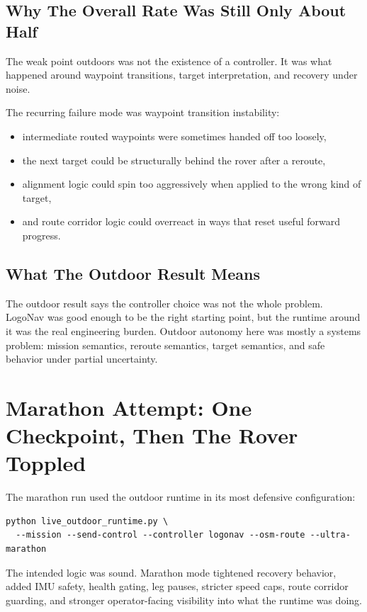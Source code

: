 \documentclass[11pt]{article}
\begin{document}
\subsection{Why The Overall Rate Was Still Only About Half}

The weak point outdoors was not the existence of a controller. It was what
happened around waypoint transitions, target interpretation, and recovery under
noise.

The recurring failure mode was waypoint transition instability:

\begin{itemize}[nosep]
  \item intermediate routed waypoints were sometimes handed off too loosely,
  \item the next target could be structurally behind the rover after a reroute,
  \item alignment logic could spin too aggressively when applied to the wrong kind
  of target,
  \item and route corridor logic could overreact in ways that reset useful forward
  progress.
\end{itemize}

\subsection{What The Outdoor Result Means}

The outdoor result says the controller choice was not the whole problem. LogoNav
was good enough to be the right starting point, but the runtime around it was the
real engineering burden. Outdoor autonomy here was mostly a systems problem:
mission semantics, reroute semantics, target semantics, and safe behavior under
partial uncertainty.

\section{Marathon Attempt: One Checkpoint, Then The Rover Toppled}

The marathon run used the outdoor runtime in its most defensive configuration:

\begin{verbatim}
python live_outdoor_runtime.py \
  --mission --send-control --controller logonav --osm-route --ultra-marathon
\end{verbatim}

The intended logic was sound. Marathon mode tightened recovery behavior, added
IMU safety, health gating, leg pauses, stricter speed caps, route corridor
guarding, and stronger operator-facing visibility into what the runtime was doing.
\end{document}
